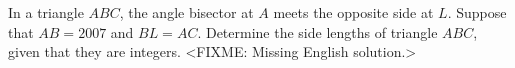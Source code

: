 \problem{}
In a triangle $ABC$, the angle bisector at $A$ meets the opposite side at $L$.
Suppose that $AB = 2007$ and $BL = AC$.
Determine the side lengths of triangle $ABC$, given that they are integers.
\solution
<FIXME: Missing English solution.>
\endproblem
